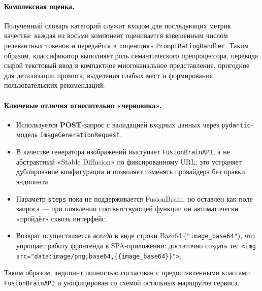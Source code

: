 \paragraph{Комплексная оценка.}
Полученный словарь категорий служит входом для последующих
метрик качества: каждая из восьми компонент оценивается
взвешенным числом релевантных токенов и
передаётся в «оценщик» \verb|PromptRatingHandler|.
Таким образом, классификатор выполняет роль
семантического препроцессора, переводя
сырой текстовый ввод в компактное многоканальное
представление, пригодное для детализации промпта,
выделения слабых мест и формирования
пользовательских рекомендаций.

\paragraph{Ключевые отличия относительно «черновика».}
\begin{itemize}
  \item Используется \textbf{POST}-запрос с валидацией входных данных через
        \verb|pydantic|-модель \verb|ImageGenerationRequest|.
  \item В качестве генератора изображений выступает \texttt{FusionBrainAPI},
        а не абстрактный «Stable Diffusion» по фиксированному URL; это устраняет
        дублирование конфигурации и позволяет изменять провайдера без правки
        эндпоинта.
  \item Параметр \verb|steps| пока не поддерживается FusionBrain, 
        но оставлен как поле запроса — при появлении соответствующей функции
        он автоматически «пройдёт» сквозь интерфейс.
  \item Возврат осуществляется \emph{всегда} в виде строки Base64
        (\verb|"image_base64"|), что упрощает работу фронтенда в SPA-приложении:
        достаточно создать тег
        \verb|<img src="data:image/png;base64,{{image_base64}}">|.
\end{itemize}

Таким образом, эндпоинт полностью согласован с предоставленными классами
\texttt{FusionBrainAPI} и унифицирован со схемой остальных маршрутов сервиса.

